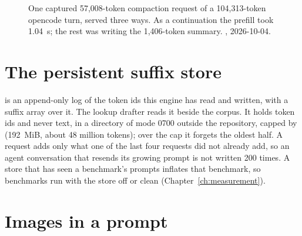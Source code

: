 \begin{figure}[htbp]
\centering
{}
\caption[One compaction three ways]{One captured 57,008-token compaction request of a 104,313-token opencode turn, served three ways. As a continuation the prefill took 1.04~s; the rest was writing the 1,406-token summary. \measured, 2026-10-04.}\label{fig:compaction}
\end{figure}

\section{The persistent suffix store}\label{sec:suffix-store}

 is an append-only log of the token ids this engine has read and written, with a suffix array over it. The lookup drafter reads it beside the corpus. It holds token ids and never text, in a directory of mode 0700 outside the repository, capped by  (192~MiB, about 48 million tokens); over the cap it forgets the oldest half. A request adds only what one of the last four requests did not already add, so an agent conversation that resends its growing prompt is not written 200 times. A store that has seen a benchmark's prompts inflates that benchmark, so benchmarks run with the store off or clean (Chapter~\ref{ch:measurement}).

\section{Images in a prompt}


